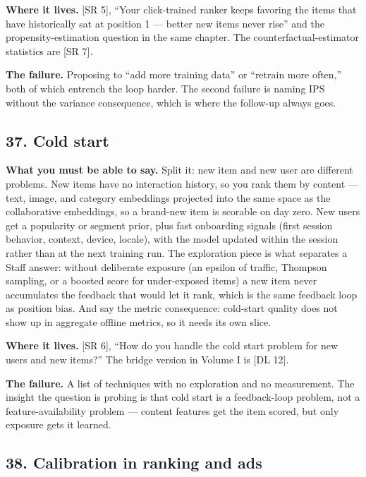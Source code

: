 \textbf{Where it lives.} [SR 5], ``Your click-trained ranker keeps favoring the items that have historically sat at position 1 --- better new items never rise'' and the propensity-estimation question in the same chapter. The counterfactual-estimator statistics are [SR 7].

\textbf{The failure.} Proposing to ``add more training data'' or ``retrain more often,'' both of which entrench the loop harder. The second failure is naming IPS without the variance consequence, which is where the follow-up always goes.

\subsection*{37. Cold start}

\textbf{What you must be able to say.} Split it: new item and new user are different problems. New items have no interaction history, so you rank them by content --- text, image, and category embeddings projected into the same space as the collaborative embeddings, so a brand-new item is scorable on day zero. New users get a popularity or segment prior, plus fast onboarding signals (first session behavior, context, device, locale), with the model updated within the session rather than at the next training run. The exploration piece is what separates a Staff answer: without deliberate exposure (an epsilon of traffic, Thompson sampling, or a boosted score for under-exposed items) a new item never accumulates the feedback that would let it rank, which is the same feedback loop as position bias. And say the metric consequence: cold-start quality does not show up in aggregate offline metrics, so it needs its own slice.

\textbf{Where it lives.} [SR 6], ``How do you handle the cold start problem for new users and new items?'' The bridge version in Volume I is [DL 12].

\textbf{The failure.} A list of techniques with no exploration and no measurement. The insight the question is probing is that cold start is a feedback-loop problem, not a feature-availability problem --- content features get the item scored, but only exposure gets it learned.

\subsection*{38. Calibration in ranking and ads}

